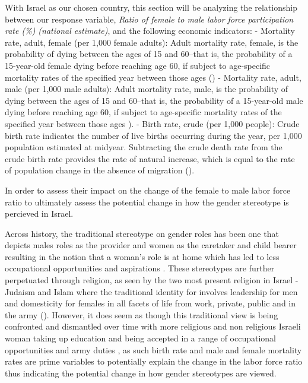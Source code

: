 \documentclass[11pt,a4paper,]{article}
\begin{document}
With Israel as our chosen country, this section will be analyzing the
relationship between our response variable, \emph{Ratio of female to
male labor force participation rate (\%) (national estimate)}, and the
following economic indicators: - Mortality rate, adult, female (per
1,000 female adults): Adult mortality rate, female, is the probability
of dying between the ages of 15 and 60--that is, the probability of a
15-year-old female dying before reaching age 60, if subject to
age-specific mortality rates of the specified year between those ages
(\textcite{TheWorldBank2018}) - Mortality rate, adult, male (per 1,000
male adults): Adult mortality rate, male, is the probability of dying
between the ages of 15 and 60--that is, the probability of a 15-year-old
male dying before reaching age 60, if subject to age-specific mortality
rates of the specified year between those ages
\textcite{TheWorldBank2018}). - Birth rate, crude (per 1,000 people):
Crude birth rate indicates the number of live births occurring during
the year, per 1,000 population estimated at midyear. Subtracting the
crude death rate from the crude birth rate provides the rate of natural
increase, which is equal to the rate of population change in the absence
of migration (\textcite{TheWorldBank2018}).

In order to assess their impact on the change of the female to male
labor force ratio to ultimately assess the potential change in how the
gender stereotype is percieved in Israel.

Across history, the traditional stereotype on gender roles has been one
that depicts males roles as the provider and women as the caretaker and
child bearer resulting in the notion that a woman's role is at home
which has led to less occupational opportunities and aspirations
\textcite{DickeAL2019}. These stereotypes are further perpetuated
through religion, as seen by the two most present religion in Israel -
Judaism and Islam where the traditional identity for involves leadership
for men and domesticity for females \textcite{Woodhead} in all facets of
life from work, private, public and in the army
(\textcite{GittlemenSI2020}). However, it does seem as though this
traditional view is being confronted and dismantled over time with more
religious and non religious Israeli woman taking up education and being
accepted in a range of occupational opportunities and army duties
\textcite{Levy2006}, as such birth rate and male and female mortality
rates are prime variables to potentially explain the change in the labor
force ratio thus indicating the potential change in how gender
stereotypes are viewed.
\end{document}
